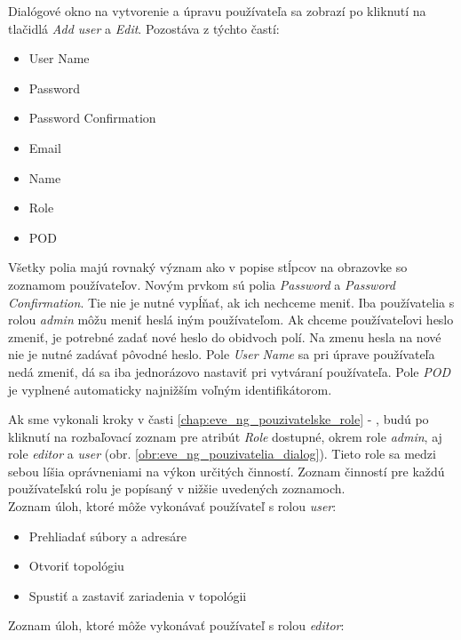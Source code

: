 Dialógové okno na vytvorenie a úpravu používateľa sa zobrazí po kliknutí na tlačidlá \emph{Add user} a \emph{Edit}. Pozostáva z týchto častí:

\begin{itemize}[noitemsep]
    \item User Name
    \item Password
    \item Password Confirmation
    \item Email
    \item Name
    \item Role
    \item POD
\end{itemize}

Všetky polia majú rovnaký význam ako v popise stĺpcov na obrazovke so zoznamom používateľov. Novým prvkom sú polia \emph{Password} a \emph{Password Confirmation}. Tie nie je nutné vypĺňať, ak ich nechceme meniť. Iba používatelia s rolou \emph{admin} môžu meniť heslá iným používateľom. Ak chceme používateľovi heslo zmeniť, je potrebné zadať nové heslo do obidvoch polí. Na zmenu hesla na nové nie je nutné zadávať pôvodné heslo. Pole \emph{User Name} sa pri úprave používateľa nedá zmeniť, dá sa iba jednorázovo nastaviť pri vytváraní používateľa. Pole \emph{POD} je vyplnené automaticky najnižším voľným identifikátorom.

Ak sme vykonali kroky v časti \ref{chap:eve_ng_pouzivatelske_role} - , budú po kliknutí na rozbaľovací zoznam pre atribút \emph{Role} dostupné, okrem role \emph{admin}, aj role \emph{editor} a \emph{user} (obr. \ref{obr:eve_ng_pouzivatelia_dialog}). Tieto role sa medzi sebou líšia oprávneniami na výkon určitých činností. Zoznam činností pre každú používateľskú rolu je popísaný v nižšie uvedených zoznamoch. \\

\noindent
Zoznam úloh, ktoré môže vykonávať používateľ s rolou \emph{user}:

\begin{itemize}[noitemsep]
    \item Prehliadať súbory a adresáre
    \item Otvoriť topológiu
    \item Spustiť a zastaviť zariadenia v topológii
\end{itemize}

\noindent
Zoznam úloh, ktoré môže vykonávať používateľ s rolou \emph{editor}:


